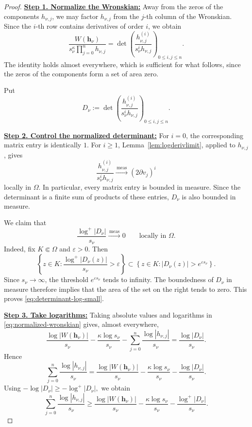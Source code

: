 \documentclass[12pt,letterpaper,reqno]{amsart}
\theoremstyle{definition}
\numberwithin{equation}{section}
\newcommand{\convmeas}{\xrightarrow{\,\mathrm{meas}\,}}
\newcommand{\hv}{\bm h}
\begin{document}
\begin{proof}

\medskip\noindent
\textbf{\underline{Step 1. Normalize the Wronskian:}}
Away from the zeros of the components \(h_{\nu,j}\), we may factor
\(h_{\nu,j}\) from the \(j\)-th column of the Wronskian. Since the
\(i\)-th row contains derivatives of order \(i\), we obtain
\begin{equation}\label{eq:normalized-wronskian}
 \frac{W(\hv_\nu)}
 {s_\nu^\kappa\prod_{j=0}^{n}h_{\nu,j}}
 =
 \det\left(
 \frac{h_{\nu,j}^{(i)}}
 {s_\nu^ih_{\nu,j}}
 \right)_{0\leq i,j\le n}.
\end{equation}
The identity holds almost everywhere, which is sufficient for what follows,
since the zeros of the components form a set of area zero.

Put
\[
D_\nu:=
\det\left(
 \frac{h_{\nu,j}^{(i)}}
 {s_\nu^ih_{\nu,j}}
 \right)_{0\leq i,j\le n}.
\]

\medskip\noindent
\textbf{\underline{Step 2. Control the normalized determinant:}}
For \(i=0\), the corresponding matrix entry is identically \(1\). For
\(i\geq1\), Lemma~\ref{lem:logderivlimit}, applied to
\(h_{\nu,j}\), gives
\[
 \frac{h_{\nu,j}^{(i)}}
 {s_\nu^ih_{\nu,j}}
 \convmeas
 (2\partial v_j)^i
\]
locally in \(\Omega\). In particular, every matrix entry is bounded in
measure. Since the determinant is a finite sum of products of these
entries, \(D_\nu\) is also bounded in measure.

We claim that
\begin{equation}\label{eq:determinant-log-small}
 \frac{\log^+|D_\nu|}{s_\nu}
 \convmeas0
 \qquad\text{locally in }\Omega.
\end{equation}
Indeed, fix \(K\Subset\Omega\) and \(\varepsilon>0\). Then
\[
 \left\{
 z\in K:
 \frac{\log^+|D_\nu(z)|}{s_\nu}>\varepsilon
 \right\}
 \subset
 \left\{
 z\in K:
 |D_\nu(z)|>e^{\varepsilon s_\nu}
 \right\}.
\]
Since \(s_\nu\to\infty\), the threshold \(e^{\varepsilon s_\nu}\) tends
to infinity. The boundedness of \(D_\nu\) in measure therefore implies
that the area of the set on the right tends to zero. This proves
\eqref{eq:determinant-log-small}.

\medskip\noindent
\textbf{\underline{Step 3. Take logarithms:}}
Taking absolute values and logarithms in
\eqref{eq:normalized-wronskian} gives, almost everywhere,
\[
 \frac{\log|W(\hv_\nu)|}{s_\nu}
 -
 \frac{\kappa\log s_\nu}{s_\nu}
 -
 \sum_{j=0}^{n}
 \frac{\log|h_{\nu,j}|}{s_\nu}
 =
 \frac{\log|D_\nu|}{s_\nu}.
\]
Hence
\[
 \sum_{j=0}^{n}
 \frac{\log|h_{\nu,j}|}{s_\nu}
 =
 \frac{\log|W(\hv_\nu)|}{s_\nu}
 -
 \frac{\kappa\log s_\nu}{s_\nu}
 -
 \frac{\log|D_\nu|}{s_\nu}.
\]
Using $
-\log|D_\nu|\geq-\log^+|D_\nu|,
$
we obtain
\begin{equation}\label{eq:wronskian-lower-bound}
 \sum_{j=0}^{n}
 \frac{\log|h_{\nu,j}|}{s_\nu}
 \geq
 \frac{\log|W(\hv_\nu)|}{s_\nu}
 -
 \frac{\kappa\log s_\nu}{s_\nu}
 -
 \frac{\log^+|D_\nu|}{s_\nu}.
\end{equation}


\end{proof}
\end{document}
